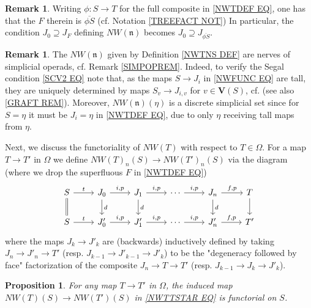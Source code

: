 \documentclass[a4paper,10pt
,draft
]{article}%
\numberwithin{equation}{section}
\numberwithin{figure}{section}
\newtheorem{proposition}[equation]{Proposition}%
\theoremstyle{definition} %
\newtheorem{remark}[equation]{Remark}%
\newcommand{\1}{\ensuremath{\mathbbm 1}}%
\begin{document}
\begin{remark}\label{J0JFREPACK REM}
	Writing $\phi \colon S \to T$ for the full composite in \eqref{NWTDEF EQ},
	one has that the $F$ therein is $\overline{\phi S}$
	(cf. Notation \ref{TREEFACT NOT})
	In particular, the condition $J_0 \supseteq J_F$
	defining $NW(\mathfrak{n})$
	becomes $J_0 \supseteq J_{\overline{\phi S}}$.
\end{remark}


\begin{remark}\label{NWTNS_REM}
	The $NW(\mathfrak{n})$ given by Definition \ref{NWTNS DEF}
	are nerves of simplicial operads,
	cf. Remark \ref{SIMPOPREM}.
	Indeed, to verify the Segal condition \eqref{SCV2 EQ} note that,
	as the maps $S \to J_i$ in \eqref{NWFUNC EQ}
	are tall, they are uniquely determined by maps
	$S_v \to J_{i,v}$ for $v \in \boldsymbol{V}(S)$,
	cf. \cite[Cor 3.75]{BP_geo} 
	(see also \ref{GRAFT REM}).
	Moreover,  $NW(\mathfrak{n})(\eta)$ is a discrete simplicial set
	since for $S=\eta$ it must be $J_i = \eta$ in \eqref{NWTDEF EQ},
	due to only $\eta$ receiving tall maps from $\eta$.
\end{remark}


Next, we discuss the functoriality of
$NW(T)$ with respect to $T \in \Omega$.
%
For a map $T \to T'$ in $\Omega$ we define
$NW(T)_n(S)
	\to 
NW(T')_n(S)$
via the diagram (where we drop the superfluous $F$ in \eqref{NWTDEF EQ})
\begin{equation}\label{NWTTSTAR EQ}
\begin{tikzcd}
	S \ar{r}{t} \ar[equal]{d}
&
	J_0 \ar{r}{i,p} \ar{d}{d}
&
	J_1 \ar{r}{i,p} \ar{d}{d}
&
	\cdots \ar{r}{i,p}
&
J_n \ar{r}{f,p} \ar{d}{d}
&
	T \ar{d}
\\
	S \ar{r}{t} 
&
	J'_0 \ar{r}{i,p}
&
	J'_1 \ar{r}{i,p}
&
	\cdots \ar{r}{i,p}
&
	J'_n \ar{r}{f,p}
&
	T'
\end{tikzcd}
\end{equation}
where the maps $J_k \to J'_k$
are (backwards) inductively defined
by taking 
$J_n \to J'_n \to T'$
(resp. 
$J_{k-1} \to J'_{k-1} \to J'_k$)
to be the "degeneracy followed by face"
factorization of the composite
$J_n \to T \to T'$
(resp.
$J_{k-1} \to J_{k} \to J'_k$).



\begin{proposition}\label{NWTNS_NAT_PROP}
	For any map $T \to T'$ in $\Omega$, the induced map
	$NW(T)(S)
	\to 
	NW(T')(S)$
	in 
	\eqref{NWTTSTAR EQ}
	is functorial on $S$.
\end{proposition}
\end{document}
